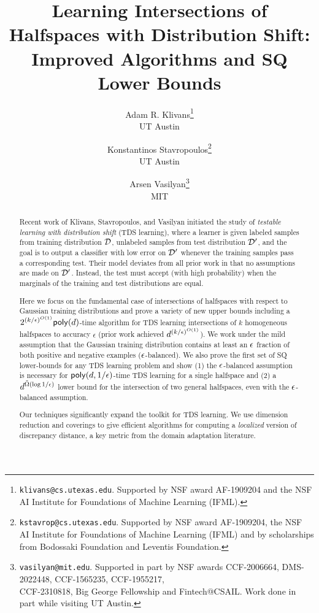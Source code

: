 \documentclass[11pt]{article}
\title{Learning Intersections of Halfspaces with Distribution Shift: Improved Algorithms and SQ Lower Bounds}
\author{
     Adam R. Klivans\thanks{\texttt{klivans@cs.utexas.edu}. Supported by NSF award AF-1909204 and the NSF AI Institute for Foundations of Machine Learning (IFML).} \\
	 UT Austin
	 \and Konstantinos Stavropoulos\thanks{\texttt{kstavrop@cs.utexas.edu}. Supported by NSF award AF-1909204, the NSF AI Institute for Foundations of Machine Learning (IFML) and by scholarships from Bodossaki Foundation and Leventis Foundation.} \\
	 UT Austin
     \and
    Arsen Vasilyan\thanks{\texttt{vasilyan@mit.edu}. Supported in part by NSF awards CCF-2006664, DMS-2022448, CCF-1565235, CCF-1955217,\\ CCF-2310818, Big George Fellowship and Fintech@CSAIL. Work done in part while visiting UT Austin.} \\
	 MIT
}
\theoremstyle{plain}
\theoremstyle{definition}
\theoremstyle{remark}
\numberwithin{equation}{section}
\begin{document}
\maketitle

\begin{abstract}%
  Recent work of Klivans, Stavropoulos, and Vasilyan initiated the study of {\em testable learning with distribution shift} (TDS learning), where a learner is given labeled samples from training distribution ${\cal D}$, unlabeled samples from test distribution ${\cal D'}$, and the goal is to output a classifier with low error on ${\cal D'}$ whenever the training samples pass a corresponding test.  Their model deviates from all prior work in that no assumptions are made on ${\cal D'}$.  Instead, the test must accept (with high probability) when the marginals of the training and test distributions are equal. 

  Here we focus on the fundamental case of intersections of halfspaces with respect to Gaussian training distributions and prove a variety of new upper bounds including a $2^{(k/\epsilon)^{O(1)}} \mathsf{poly}(d)$-time algorithm for TDS learning intersections of $k$ homogeneous halfspaces to accuracy $\epsilon$ (prior work achieved $d^{(k/\epsilon)^{O(1)}}$). 
 We work under the mild assumption that the Gaussian training distribution contains at least an $\epsilon$ fraction of both positive and negative examples ($\epsilon$-balanced).  We also prove the first set of SQ lower-bounds for any TDS learning problem and show (1) the $\epsilon$-balanced assumption is necessary for $\mathsf{poly}(d,1/\epsilon)$-time TDS learning for a single halfspace and (2) a $d^{\tilde{\Omega}(\log 1/\epsilon)}$ lower bound for the intersection of two general halfspaces, even with the $\epsilon$-balanced assumption.

 Our techniques significantly expand the toolkit for TDS learning.  We use dimension reduction and coverings to give efficient algorithms for computing a {\em localized} version of discrepancy distance, a key metric from the domain adaptation literature.
 
 
  
\end{abstract}

\vspace{1em}










\appendix



\end{document}
